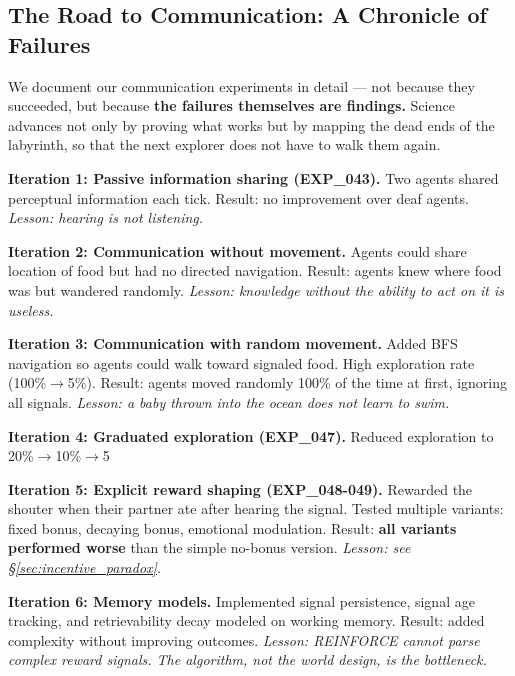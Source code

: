 \documentclass{article}
\begin{document}
\subsection{The Road to Communication: A Chronicle of Failures}
\label{sec:failures}
We document our communication experiments in detail --- not because they succeeded, but because \textbf{the failures themselves are findings.} Science advances not only by proving what works but by mapping the dead ends of the labyrinth, so that the next explorer does not have to walk them again.

\textbf{Iteration 1: Passive information sharing (EXP\_043).} Two agents shared perceptual information each tick. Result: no improvement over deaf agents. \textit{Lesson: hearing is not listening.}

\textbf{Iteration 2: Communication without movement.} Agents could share location of food but had no directed navigation. Result: agents knew where food was but wandered randomly. \textit{Lesson: knowledge without the ability to act on it is useless.}

\textbf{Iteration 3: Communication with random movement.} Added BFS navigation so agents could walk toward signaled food. High exploration rate (100\%$\rightarrow$5\%). Result: agents moved randomly 100\% of the time at first, ignoring all signals. \textit{Lesson: a baby thrown into the ocean does not learn to swim.}

\textbf{Iteration 4: Graduated exploration (EXP\_047).} Reduced exploration to 20\%$\rightarrow$10\%$\rightarrow$5%

\textbf{Iteration 5: Explicit reward shaping (EXP\_048-049).} Rewarded the shouter when their partner ate after hearing the signal. Tested multiple variants: fixed bonus, decaying bonus, emotional modulation. Result: \textbf{all variants performed worse} than the simple no-bonus version. \textit{Lesson: see \S\ref{sec:incentive_paradox}.}

\textbf{Iteration 6: Memory models.} Implemented signal persistence, signal age tracking, and retrievability decay modeled on working memory. Result: added complexity without improving outcomes. \textit{Lesson: REINFORCE cannot parse complex reward signals. The algorithm, not the world design, is the bottleneck.}
\end{document}
